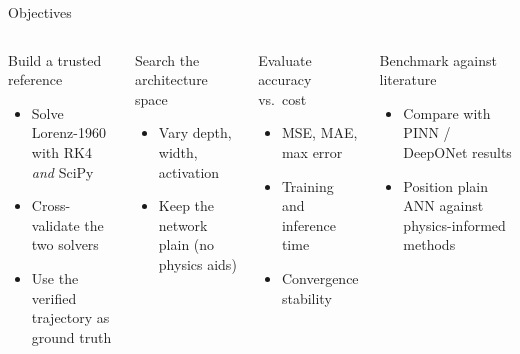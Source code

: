 \documentclass[aspectratio=169,11pt]{beamer}
\begin{document}
\begin{frame}{Objectives}
  \begin{columns}[t]
      \begin{card}{Build a trusted reference}
        \footnotesize
        \begin{itemize}
          \item Solve Lorenz-1960 with RK4 \emph{and} SciPy
          \item Cross-validate the two solvers
          \item Use the verified trajectory as ground truth
        \end{itemize}
      \end{card}
      \vspace{0.2cm}
      \begin{card}{Search the architecture space}
        \footnotesize
        \begin{itemize}
          \item Vary depth, width, activation
          \item Keep the network plain (no physics aids)
        \end{itemize}
      \end{card}
      \begin{card}{Evaluate accuracy vs.\ cost}
        \footnotesize
        \begin{itemize}
          \item MSE, MAE, max error
          \item Training and inference time
          \item Convergence stability
        \end{itemize}
      \end{card}
      \vspace{0.2cm}
      \begin{card}{Benchmark against literature}
        \footnotesize
        \begin{itemize}
          \item Compare with PINN / DeepONet results
          \item Position plain ANN against physics-informed methods
        \end{itemize}
      \end{card}
  \end{columns}
\end{frame}
\end{document}
